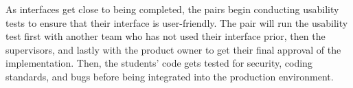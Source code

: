 



As interfaces get close to being completed, the pairs begin conducting usability tests \cite{usabilitytesting} to ensure that their interface is user-friendly. The pair will run the usability test first with another team who has not used their interface prior, then the supervisors, and lastly with the product owner to get their final approval of the implementation. Then, the students’ code gets tested for security, coding standards, and bugs before being integrated into the production environment.


